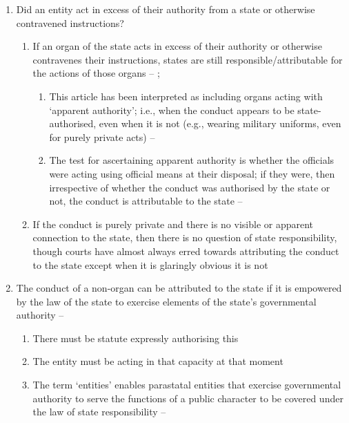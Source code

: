 \begin{enumerate}
\begin{enumerate}
\begin{enumerate}
        \end{enumerate}
        \item Did an entity act in excess of their authority from a state or otherwise contravened instructions?
        \begin{enumerate}
            \item If an organ of the state acts in excess of their authority or otherwise contravenes their instructions, states are still responsible/attributable for the actions of those organs -- ; 
            \begin{enumerate}
                \item This article has been interpreted as including organs acting with `apparent authority'; i.e., when the conduct appears to be state-authorised, even when it is not (e.g., wearing military uniforms, even for purely private acts) -- 
                \item The test for ascertaining apparent authority is whether the officials were acting using official means at their disposal; if they were, then irrespective of whether the conduct was authorised by the state or not, the conduct is attributable to the state -- 
            \end{enumerate}
            \item If the conduct is purely private and there is no visible or apparent connection to the state, then there is no question of state responsibility, though courts have almost always erred towards attributing the conduct to the state except when it is glaringly obvious it is not
        \end{enumerate}
        \item The conduct of a non-organ can be attributed to the state if it is empowered by the law of the state to exercise elements of the state's governmental authority -- 
        \begin{enumerate}
            \item There must be statute expressly authorising this
            \item The entity must be acting in that capacity at that moment
            \item The term `entities' enables parastatal entities that exercise governmental authority to serve the functions of a public character to be covered under the law of state responsibility -- 

\end{enumerate}
\end{enumerate}
\end{enumerate}
